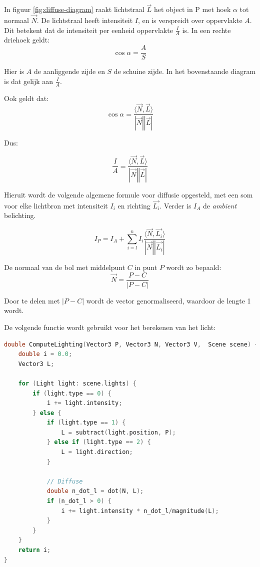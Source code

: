 \documentclass[12pt, a4paper]{article}
\begin{document}
In figuur \ref{fig:diffuse-diagram} raakt lichtstraal $\overrightarrow{L}$ het object in P met hoek $\alpha$ tot normaal $\overrightarrow{N}$. De lichtstraal heeft intensiteit $I$, en is verspreidt over oppervlakte $A$. Dit betekent dat de intensiteit per eenheid oppervlakte $\frac{I}{A}$ is. In een rechte driehoek geldt: 
\[\cos{\alpha}=\frac{A}{S}\]

Hier is $A$ de aanliggende zijde en $S$ de schuine zijde. In het bovenstaande diagram is dat gelijk aan $\frac{I}{A}$.

Ook geldt dat:
\[\cos \alpha = \frac{\langle \overrightarrow{N},\overrightarrow{L}\rangle}{|\overrightarrow{N}||\overrightarrow{L}|}\]

Dus: 

\[\frac{I}{A} = \frac{\langle \overrightarrow{N},\overrightarrow{L}\rangle}{|\overrightarrow{N}||\overrightarrow{L}|}\]

Hieruit wordt de volgende algemene formule voor diffusie opgesteld, met een som voor elke lichtbron met intensiteit $I_i$ en richting $\overrightarrow{L_i}$. Verder is $I_A$ de \textit{ambient} belichting.

\[I_P=I_A+\sum_{i=l}^{n}I_i\frac{\langle \overrightarrow{N}, \overrightarrow{L_i} \rangle}{|\overrightarrow{N}||\overrightarrow{L_i}|}\]

De normaal van de bol met middelpunt $C$ in punt $P$ wordt zo bepaald:
\[\overrightarrow{N}=\frac{P-C}{|P-C|}\]

Door te delen met $|P-C|$ wordt de vector genormaliseerd, waardoor de lengte 1 wordt.

De volgende functie wordt gebruikt voor het berekenen van het licht:

\begin{lstlisting}[language=C++]
double ComputeLighting(Vector3 P, Vector3 N, Vector3 V,  Scene scene) {
    double i = 0.0;
    Vector3 L;

    for (Light light: scene.lights) {
        if (light.type == 0) {
            i += light.intensity;
        } else {
            if (light.type == 1) {
                L = subtract(light.position, P);
            } else if (light.type == 2) {
                L = light.direction;
            }

            // Diffuse
            double n_dot_l = dot(N, L);
            if (n_dot_l > 0) {
                i += light.intensity * n_dot_l/magnitude(L);
            }
        }
    }
    return i;
}
\end{lstlisting}
\end{document}
